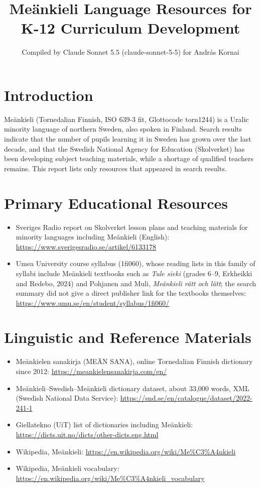 \documentclass[12pt]{article}
\title{Me\"ankieli Language Resources for K-12 Curriculum Development}
\author{Compiled by Claude Sonnet 5.5 (claude-sonnet-5-5) for Andr\'as Kornai}
\date{}
\begin{document}
\maketitle

\section{Introduction}
Me\"ankieli (Tornedalian Finnish, ISO 639-3 fit, Glottocode torn1244) is a Uralic minority language of northern Sweden, also spoken in Finland. Search results indicate that the number of pupils learning it in Sweden has grown over the last decade, and that the Swedish National Agency for Education (Skolverket) has been developing subject teaching materials, while a shortage of qualified teachers remains. This report lists only resources that appeared in search results.

\section{Primary Educational Resources}
\begin{itemize}
\item Sveriges Radio report on Skolverket lesson plans and teaching materials for minority languages including Me\"ankieli (English): \url{https://www.sverigesradio.se/artikel/6133178}
\item Umea University course syllabus (1fi060), whose reading lists in this family of syllabi include Me\"ankieli textbooks such as \emph{Tule sieki} (grades 6--9, Erkheikki and Redebo, 2024) and Pohjanen and Muli, \emph{Me\"ankieli r\"att och l\"att}; the search summary did not give a direct publisher link for the textbooks themselves: \url{https://www.umu.se/en/student/syllabus/1fi060/}
\end{itemize}

\section{Linguistic and Reference Materials}
\begin{itemize}
\item Me\"ankielen sanakirja (MEÄN SANA), online Tornedalian Finnish dictionary since 2012: \url{https://meankielensanakirja.com/en/}
\item Me\"ankieli--Swedish--Me\"ankieli dictionary dataset, about 33,000 words, XML (Swedish National Data Service): \url{https://snd.se/en/catalogue/dataset/2022-241-1}
\item Giellatekno (UiT) list of dictionaries including Me\"ankieli: \url{https://dicts.uit.no/dicts/other-dicts.eng.html}
\item Wikipedia, Me\"ankieli: \url{https://en.wikipedia.org/wiki/Me%C3%A4nkieli}
\item Wikipedia, Me\"ankieli vocabulary: \url{https://en.wikipedia.org/wiki/Me%C3%A4nkieli_vocabulary}
\end{itemize}
\end{document}
